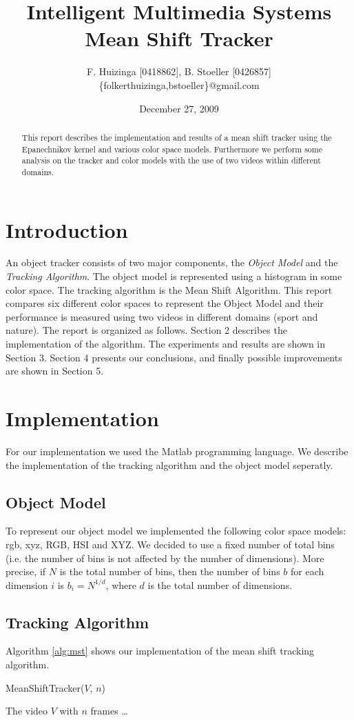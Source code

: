 \documentclass[11pt]{article}
\title{Intelligent Multimedia Systems \\ Mean Shift Tracker}
\author{F. Huizinga [0418862], B. Stoeller [0426857] \\
      \{folkerthuizinga,bstoeller\}@gmail.com}
\date{December 27, 2009}
\begin{document}
\maketitle

\begin{abstract}
This report describes the implementation and results of a mean shift tracker
using the Epanechnikov kernel and various color space models. Furthermore we
perform some analysis on the tracker and color models with the use of two
videos within different domains.
\end{abstract}


\section{Introduction}
An object tracker consists of two major components, the \emph{Object Model} and
the \emph{Tracking Algorithm}. The object model is represented using a
histogram in some color space. The tracking algorithm is the Mean Shift
Algorithm. This report compares six different color spaces to represent the
Object Model and their performance is measured using two videos in different
domains (sport and nature). The report is organized as follows.  Section 2
describes the implementation of the algorithm. The experiments and results are
shown in Section 3. Section 4 presents our conclusions, and finally possible
improvements are shown in Section 5.


\section{Implementation}
For our implementation we used the Matlab programming language. We describe the
implementation of the tracking algorithm and the object model seperatly.

\subsection{Object Model}
To represent our object model we implemented the following color space models:
rgb, xyz, RGB, HSI and XYZ. We decided to use a fixed number of total bins
(i.e. the number of bins is not affected by the number of dimensions). More
precise, if $N$ is the total number of bins, then the number of bins $b$ for
each dimension $i$ is $b_i = N^{1/d}$, where $d$ is the total number of
dimensions.

\subsection{Tracking Algorithm}
Algorithm \ref{alg:mst} shows our implementation of the mean shift tracking
algorithm.
\begin{algorithm}
	\caption{MeanShiftTracker($V$, $n$)}
	\begin{algorithmic}[1]
	\REQUIRE The video $V$ with $n$ frames
	\STATE \dots
	\medskip
	\end{algorithmic}
\label{alg:mst}
\end{algorithm}
\end{document}
